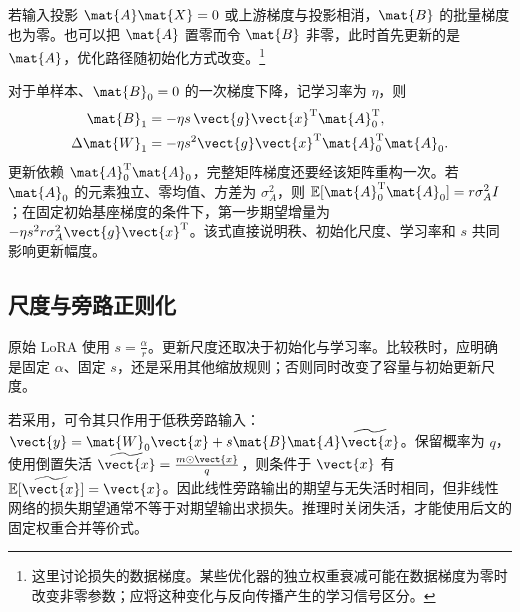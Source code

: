 \documentclass[../textbook.tex]{subfiles}
\begin{document}
若输入投影 $\mat{A}\mat{X}=0$ 或上游梯度与投影相消，$\mat{B}$ 的批量梯度也为零。也可以把 $\mat{A}$ 置零而令 $\mat{B}$ 非零，此时首先更新的是 $\mat{A}$，优化路径随初始化方式改变。\footnote{这里讨论损失的数据梯度。某些优化器的独立权重衰减可能在数据梯度为零时改变非零参数；应将这种变化与反向传播产生的学习信号区分。}

对于单样本、$\mat{B}_0=0$ 的一次梯度下降，记学习率为 $\eta$，则
\begin{equation}
 \begin{aligned}
  \mat{B}_1 &= -\eta s\,\vect{g} \vect{x}^{\mathrm{T}}\mat{A}_0^{\mathrm{T}}, \\
  \Delta \mat{W}_1 &= -\eta s^2\vect{g} \vect{x}^{\mathrm{T}}\mat{A}_0^{\mathrm{T}}\mat{A}_0.
 \end{aligned}
\end{equation}
更新依赖 $\mat{A}_0^{\mathrm{T}}\mat{A}_0$，完整矩阵梯度还要经该矩阵重构一次。若 $\mat{A}_0$ 的元素独立、零均值、方差为 $\sigma_A^2$，则 $\mathbb E[\mat{A}_0^{\mathrm{T}}\mat{A}_0]=r\sigma_A^2I$；在固定初始基座梯度的条件下，第一步期望增量为 $-\eta s^2r\sigma_A^2\vect{g}\vect{x}^{\mathrm{T}}$。该式直接说明秩、初始化尺度、学习率和 $s$ 共同影响更新幅度。

\subsection{尺度与旁路正则化}
原始 LoRA 使用 $s=\frac{\alpha}{r}$\cite{huLoRALowRankAdaptation2022}。更新尺度还取决于初始化与学习率。比较秩时，应明确是固定 $\alpha$、固定 $s$，还是采用其他缩放规则；否则同时改变了容量与初始更新尺度。

若采用，可令其只作用于低秩旁路输入：$\vect{y}=\mat{W}_0\vect{x}+s\mat{B}\mat{A}\widetilde{\vect{x}}$。保留概率为 $q$，使用倒置失活 $\widetilde{\vect{x}}=\frac{m\odot \vect{x}}{q}$，则条件于 $\vect{x}$ 有 $\mathbb E[\widetilde{\vect{x}}]=\vect{x}$。因此线性旁路输出的期望与无失活时相同，但非线性网络的损失期望通常不等于对期望输出求损失。推理时关闭失活，才能使用后文的固定权重合并等价式。
\end{document}
